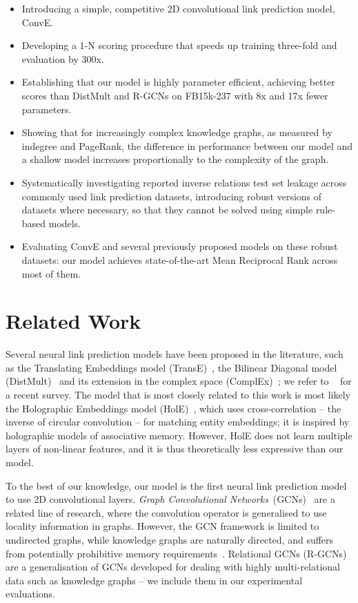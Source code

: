 \documentclass[letterpaper]{article}
\newcommand{\citet}[1]{\citeauthor{#1}~\shortcite{#1}}
\newcommand{\citep}{\cite}
\begin{document}
\begin{itemize}
\item{
    Introducing a simple, competitive 2D convolutional link prediction model, ConvE.
}
\item{
    Developing a 1-N scoring procedure that speeds up training three-fold and evaluation by 300x.
}
\item{
    Establishing that our model is highly parameter efficient, achieving better scores than DistMult and R-GCNs on FB15k-237 with 8x and 17x fewer parameters.
}
\item{
    Showing that for increasingly complex knowledge graphs, as measured by indegree and PageRank, the difference in performance between our model and a shallow model increases proportionally to the complexity of the graph.
}
\item{
    Systematically investigating reported inverse relations test set leakage across commonly used link prediction datasets, introducing robust versions of datasets where necessary, so that they cannot be solved using simple rule-based models.
}
\item{
    Evaluating ConvE and several previously proposed models on these robust datasets: our model achieves state-of-the-art Mean Reciprocal Rank across most of them.
}
\end{itemize}


\section{Related Work}


Several neural link prediction models have been proposed in the literature, such as the Translating Embeddings model (TransE)~\citep{DBLP:conf/nips/BordesUGWY13}, the Bilinear Diagonal model (DistMult)~\citep{yang15:embedding} and its extension in the complex space (ComplEx)~\citep{DBLP:conf/icml/TrouillonWRGB16}; we refer to \citet{nickel2016review} for a recent survey.
The model that is most closely related to this work is most likely the Holographic Embeddings model (HolE)~\citep{DBLP:conf/aaai/NickelRP16}, which uses cross-correlation -- the inverse of circular convolution -- for matching entity embeddings; it is inspired by holographic models of associative memory.
However, HolE does not learn multiple layers of non-linear features, and it is thus theoretically less expressive than our model.


To the best of our knowledge, our model is the first neural link prediction model to use 2D convolutional layers.
\emph{Graph Convolutional Networks}~(GCNs)~\citep{DBLP:conf/nips/DuvenaudMABHAA15,DBLP:conf/nips/DefferrardBV16,DBLP:journals/corr/KipfW16} are a related line of research, where the convolution operator is generalised to use locality information in graphs.
However, the GCN framework is limited to undirected graphs, while knowledge graphs are naturally directed, and suffers from potentially prohibitive memory requirements~\citep{DBLP:journals/corr/KipfW16}.
Relational GCNs (R-GCNs)~\citep{schlichtkrull2017modeling} are a generalisation of GCNs developed for dealing with highly multi-relational data such as knowledge graphs -- we include them in our experimental evaluations.
\end{document}
